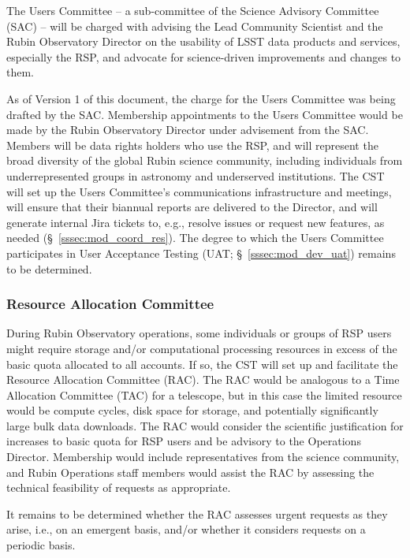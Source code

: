 \documentclass[DM,authoryear,toc]{lsstdoc}
\begin{document}
The Users Committee -- a sub-committee of the Science Advisory Committee (SAC) -- will be charged with advising the Lead Community Scientist and the Rubin Observatory Director on the usability of LSST data products and services, especially the RSP, and advocate for science-driven improvements and changes to them.

As of Version 1 of this document, the charge for the Users Committee was being drafted by the SAC.
Membership appointments to the Users Committee would be made by the Rubin Observatory Director under advisement from the SAC.
Members will be data rights holders who use the RSP, and will represent the broad diversity of the global Rubin science community, including individuals from underrepresented groups in astronomy and underserved institutions.
The CST will set up the Users Committee's communications infrastructure and meetings, will ensure that their biannual reports are delivered to the Director, and will generate internal Jira tickets to, e.g., resolve issues or request new features, as needed (\S~\ref{sssec:mod_coord_res}).
The degree to which the Users Committee participates in User Acceptance Testing (UAT; \S~\ref{sssec:mod_dev_uat}) remains to be determined.


\subsubsection{Resource Allocation Committee}\label{sssec:mod_coord_rac}

During Rubin Observatory operations, some individuals or groups of RSP users might require storage and/or computational processing resources in excess of the basic quota allocated to all accounts.
If so, the CST will set up and facilitate the Resource Allocation Committee (RAC).
The RAC would be analogous to a Time Allocation Committee (TAC) for a telescope, but in this case the limited resource would be compute cycles, disk space for storage, and potentially significantly large bulk data downloads.
The RAC would consider the scientific justification for increases to basic quota for RSP users and be advisory to the Operations Director.
Membership would include representatives from the science community, and Rubin Operations staff members would assist the RAC by assessing the technical feasibility of requests as appropriate.

It remains to be determined whether the RAC assesses urgent requests as they arise, i.e., on an emergent basis, and/or whether it considers requests on a periodic basis.
\end{document}
